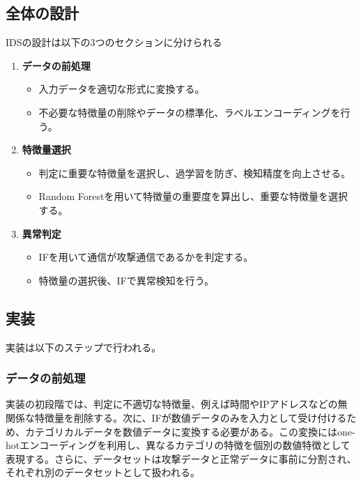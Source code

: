 \documentclass{css}
\begin{document}
\subsection{全体の設計}
IDSの設計は以下の3つのセクションに分けられる
\begin{enumerate}
    \item \textbf{データの前処理}
        \begin{itemize}
            \item 入力データを適切な形式に変換する。
            \item 不必要な特徴量の削除やデータの標準化、ラベルエンコーディングを行う。
        \end{itemize}
    \item \textbf{特徴量選択}
        \begin{itemize}
            \item 判定に重要な特徴量を選択し、過学習を防ぎ、検知精度を向上させる。
            \item Random Forestを用いて特徴量の重要度を算出し、重要な特徴量を選択する。
        \end{itemize}
    \item \textbf{異常判定}
        \begin{itemize}
            \item IFを用いて通信が攻撃通信であるかを判定する。
            \item 特徴量の選択後、IFで異常検知を行う。
        \end{itemize}
\end{enumerate}

\subsection{実装}

実装は以下のステップで行われる。

\subsubsection{データの前処理}

実装の初段階では、判定に不適切な特徴量、例えば時間やIPアドレスなどの無関係な特徴量を削除する。次に、IFが数値データのみを入力として受け付けるため、カテゴリカルデータを数値データに変換する必要がある。この変換にはone-hotエンコーディングを利用し、異なるカテゴリの特徴を個別の数値特徴として表現する。さらに、データセットは攻撃データと正常データに事前に分割され、それぞれ別のデータセットとして扱われる。
\end{document}
